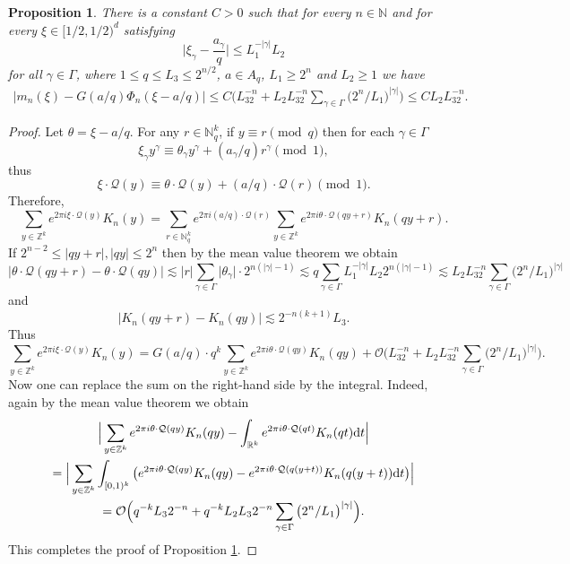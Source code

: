 \documentclass[a4paper,oneside]{amsart}
\theoremstyle{plain}
\newtheorem{proposition}{Proposition}[section]
\theoremstyle{definition}
\numberwithin{equation}{section}
\theoremstyle{plain}
\newcommand{\RR}{\mathbb{R}}
\newcommand{\ZZ}{\mathbb{Z}}
\newcommand{\NN}{\mathbb{N}}
\newcommand{\calQ}{\mathcal{Q}}
\newcommand{\norm}[1]{{\left\lvert #1 \right\rvert}}
\newcommand{\sprod}[2] {{#1 \cdot #2}}
\newcommand{\abs}[1]{{\lvert {#1} \rvert}}
\newcommand{\8}{\infty}
\begin{document}
\begin{proposition}
  \label{prop:0}
 There is a constant $C>0$ such
  that for every $n\in\NN$ and for every $\xi\in [1/2, 1/2)^d$ satisfying 
        $$
	\Big\lvert \xi_\gamma - \frac{a_\gamma}{q} \Big\rvert \leq
        L_1^{-|\gamma|}L_2
	$$
	for all $\gamma \in \Gamma$, where  $1\le q\le L_3\le 2^{n/2}$, $a\in
        A_q$, $L_1\ge 2^n$  and $L_2\ge1$ we have 
        \begin{align}
          \label{eq:41}
          \big|m_n(\xi)-G(a/q)\Phi_{n}(\xi-a/q)\big|\le 
          C\Big(L_32^{-n}
          +L_2L_32^{-n}\sum_{\gamma \in
            \Gamma}\big(2^n/L_1\big)^{|\gamma|}\Big)\le CL_2L_32^{-n}.
        \end{align}

\end{proposition}
\begin{proof}
	Let $\theta = \xi - a/q$. For any $r \in \NN_q^k$, if $y \equiv r \pmod q$ then
	for each $\gamma \in \Gamma$
	$$
	\xi_\gamma y^\gamma \equiv \theta_\gamma y^\gamma
	+ (a_\gamma/q) r^\gamma \pmod 1,
	$$
	thus
	$$
	\sprod{\xi}{\calQ(y)} \equiv \sprod{\theta}{\calQ(y)} + \sprod{(a/q)}{\calQ(r)} \pmod 1.
	$$
	Therefore,
	\[
	\sum_{y \in \ZZ^k} e^{2\pi i \sprod{\xi}{\calQ(y)}} K_n(y)
	=
	\sum_{r \in \NN_q^k}
	e^{2\pi i \sprod{(a/q)}{\calQ(r)}}
	\sum_{y \in \ZZ^k}
	e^{2\pi i \sprod{\theta}{\calQ(qy+r)}}
	K_n(qy+r).
	\]
	If $2^{n-2} \leq \norm{q y + r}, \norm{qy} \leq 2^n$ then by the
        mean value theorem we obtain
	\[
	\big\lvert
	\sprod{\theta}{\calQ(q y + r)} - \sprod{\theta}{\calQ(q y)}
	\big\rvert
	\lesssim
	\norm{r}
	\sum_{\gamma \in \Gamma}
	\abs{\theta_\gamma}
	\cdot
	2^{n(\abs{\gamma} - 1)}
	\lesssim
	q \sum_{\gamma \in \Gamma}
	L_1^{-\abs{\gamma}} L_2 2^{n(\abs{\gamma}-1)}
	\lesssim L_2L_32^{-n}\sum_{\gamma \in \Gamma}\big(2^n/L_1\big)^{\abs{\gamma}}
	\]
	and
	$$
	\big\lvert
	K_n(q y + r) - K_n(q y)
	\big\rvert
	\lesssim
	2^{-n(k+1)}L_3.
        $$
	Thus
        \[
        \sum_{y \in \ZZ^k} e^{2\pi i \sprod{\xi}{\calQ(y)}} K_n(y)
	=G(a/q)\cdot q^k\sum_{y \in \ZZ^k} e^{2\pi i
          \sprod{\theta}{\calQ(qy)}} K_n(qy)
+\mathcal O\Big(L_32^{-n}+L_2L_32^{-n}\sum_{\gamma \in \Gamma}\big(2^n/L_1\big)^{|\gamma|}\Big).
        \]
Now one can replace the sum on the right-hand side by the
integral. Indeed,  again by the mean value theorem  we obtain
  \begin{multline*}
    \Big|\sum_{y \in \ZZ^k} e^{2\pi i
          \sprod{\theta}{\calQ(qy)}} K_n(qy)-\int_{\RR^k}e^{2\pi i
          \theta\cdot\calQ(qt)}K_n(qt){\rm d}t\Big|\\
    = \Big|\sum_{y \in \ZZ^k} \int_{[0, 1)^k}\big(e^{2\pi i
          \sprod{\theta}{\calQ(qy)}} K_n(qy)-e^{2\pi i
          \theta\cdot\calQ(q(y+t))}K_n(q(y+t)){\rm d}t\big)\Big|\\
=\mathcal O\Big(q^{-k}L_32^{-n}+q^{-k}L_2L_32^{-n}\sum_{\gamma \in \Gamma}\big(2^n/L_1\big)^{|\gamma|}\Big).
  \end{multline*}
This completes the proof of Proposition \ref{prop:0}.
\end{proof}
\end{document}
